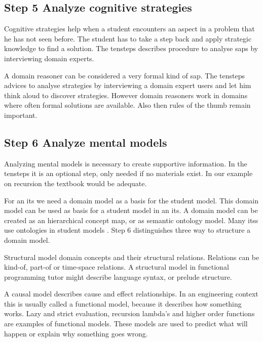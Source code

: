 \subsection{Step 5 Analyze cognitive strategies}
Cognitive strategies help when a student encounters an aspect in a problem that he has not seen before.
The student has to take a step back and apply strategic knowledge to find a solution.
The \gls{tensteps} describes procedure to analyse \glspl{sap}  by interviewing domain experts.

A domain reasoner can be considered a very formal kind of \gls{sap}.
The \gls{tensteps} advices to analyse strategies by interviewing a domain expert users and let him think aloud to discover strategies.
However domain reasoners work in domains where often formal solutions are available.
Also then rules of the thumb remain important.


\subsection{Step 6 Analyze mental models}

\label{c02:mental}
Analyzing mental models is necessary to create supportive information.
In the \gls{tensteps} it is an optional step, only needed if no materials exist.
In our example on recursion the textbook \citep{Hinze2007} would be adequate.

For an \gls{its} we need a domain model as a basis for the student model.
This domain model can be used as basis for a student model in an \gls{its}.
A domain model can be created as an hierarchical concept map, or as semantic ontology model.
Many \glspl{its} use ontologies in student models \citep{ontology}.
Step 6 distinguishes three way to structure a domain model.

Structural model  domain concepts and their structural relations.
Relations can be kind-of, part-of or time-space relations.
A structural model in  functional programming tutor might describe language syntax, or prelude structure.

A causal model describes cause and effect relationships.
In an engineering context this is usually called a functional model, because it describes how something works.
Lazy and strict evaluation, recursion lambda's and higher order functions are examples of functional models.
These models are used to predict what will happen or explain why something goes wrong.

